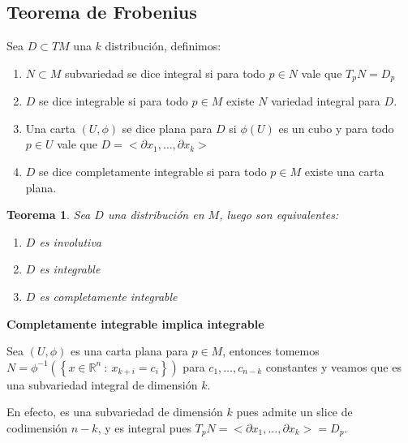 \documentclass[11pt]{article}
\newcommand{\R}{{\mathbb{R}}}
\newcommand\tq{~:~}
\newcommand{\sett}[1]{\left\lbrace#1\right\rbrace}
\newtheorem{theorem}{Teorema}
\numberwithin{theorem}{subsection}
\newenvironment{proof}[1][Demostraci\'on]{\begin{trivlist}
		\item[\hskip \labelsep {\bfseries #1}]}{\end{trivlist}}
\newenvironment{definition}[1][Definici\'on]{\begin{trivlist}
		\item[\hskip \labelsep {\bfseries #1}]}{\end{trivlist}}
\begin{document}
\begin{proof}
	\pagebreak
	
	\section{Teorema de Frobenius}
	
	\begin{definition}
		Sea $D \subset TM$ una $k$ distribuci\'on, definimos:
		
		\begin{enumerate}
			\item $N \subset M$ subvariedad  se dice integral si para todo $p \in N$ vale que $T_pN = D_p$
			\item $D$ se dice integrable si para todo $p \in M$ existe $N$ variedad integral para $D$.
			\item Una carta $(U,\phi)$ se dice plana para $D$ si $\phi(U)$ es un cubo y para todo $p \in U$ vale que $D = <\partial x_1, \dots, \partial x_k>$
			\item $D$ se dice completamente integrable si para todo $p \in M$ existe una carta plana.
		\end{enumerate}
		
		\begin{theorem}
			Sea $D$ una distribuci\'on en $M$, luego son equivalentes:
			
			\begin{enumerate}
				\item $D$ es involutiva
				\item $D$ es integrable
				\item $D$ es completamente integrable
			\end{enumerate}
			
		\end{theorem}
		
		\begin{proof}
			
			\medskip
			
			\textbf{Completamente integrable implica integrable}
			
			\medskip
			
			Sea $(U,\phi)$ es una carta plana para $p \in M$, entonces tomemos $N = \phi^{-1} \left(\sett{x \in \R^n \tq x_{k+i} = c_i}\right)$ para $c_1, \dots, c_{n-k}$ constantes y veamos que es una subvariedad integral de dimensi\'on $k$.
			
			En efecto, es una subvariedad de dimensi\'on $k$ pues admite un slice de codimensi\'on $n-k$, y es integral pues $T_pN = <\partial x_1, \dots, \partial x_k> = D_p$.
			

\end{proof}
\end{definition}
\end{proof}
\end{document}
